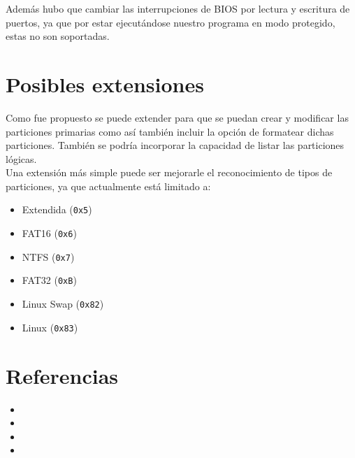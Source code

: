 \documentclass[a4paper, 11pt]{article}
\begin{document}
Adem\'as hubo que cambiar las interrupciones de BIOS por lectura y escritura de puertos, ya que por estar ejecut\'andose nuestro programa en modo protegido, estas no son soportadas.

\section*{Posibles extensiones}

Como fue propuesto se puede extender para que se puedan crear y modificar las particiones primarias como as\'i tambi\'en incluir la opci\'on de formatear dichas particiones. Tambi\'en se podr\'ia incorporar la capacidad de listar las particiones l\'ogicas.
\\

Una extensi\'on m\'as simple puede ser mejorarle el reconocimiento de tipos de particiones, ya que actualmente est\'a limitado a:
\begin{itemize}
\item Extendida (\verb!0x5!)
\item FAT16 (\verb!0x6!)
\item NTFS (\verb!0x7!)
\item FAT32 (\verb!0xB!)
\item Linux Swap (\verb!0x82!)
\item Linux (\verb!0x83!)
\end{itemize}

\section*{Referencias}
\begin{itemize}
\item {}
\item {}
\item {}
\item {}
\end{itemize}
\end{document}
